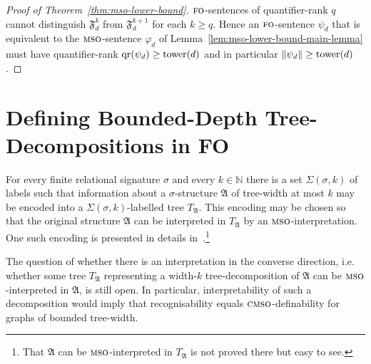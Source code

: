 \documentclass[11pt]{article}
\renewcommand{\phi}{\varphi}
\newcommand{\tower}{\textup{tower}}
\newcommand{\logic}[1]{\textsc{#1}}
\newcommand{\FO}{\logic{fo}}
\newcommand{\MSO}{\logic{mso}}
\newcommand{\CMSO}{\logic{cmso}}
\newcommand{\size}[1]{\|#1\|}
\newcommand{\qr}[1]{\operatorname{qr}(#1)}
\newcommand{\struct}[1]{\mathfrak{#1}}
\newcommand{\AS}{\struct{A}}
\newcommand{\FS}{\struct{F}}
\newcommand{\N}{\mathbb{N}}
\begin{document}
\begin{proof}[Proof of Theorem~\ref{thm:mso-lower-bound}]  
  $\FO$-sentences of quantifier-rank $q$ cannot distinguish $\FS_d^k$
  from $\FS_d^{k+1}$ for each $k\geq q$. Hence an $\FO$-sentence
  $\psi_d$ that is equivalent to the $\MSO$-sentence $\phi_d$ of
  Lemma~\ref{lem:mso-lower-bound-main-lemma} must have quantifier-rank
  $\qr{\psi_d}\geq \tower(d)$ and in particular $\size{\psi_d} \geq
  \tower(d)$.
\end{proof}

\section{Defining Bounded-Depth Tree-Decompositions in FO}
\label{sec:canondecomp}

For every finite relational signature $\sigma$ and every $k \in \N$
there is a set $\Sigma(\sigma,k)$ of labels such that information
about a $\sigma$-structure $\AS$ of tree-width at most $k$ may be
encoded into a $\Sigma(\sigma,k)$-labelled tree $T_\AS$. This encoding
may be chosen so that the original structure $\AS$ can be interpreted in
$T_\AS$ by an $\MSO$-interpretation. One such encoding is presented in
details in~\cite[Section~11.4]{FlumGrohe2004}.\footnote{That $\AS$ can
  be $\MSO$-interpreted in $T_\AS$ is not proved there but easy to see.}

The question of whether there is an interpretation in the converse
direction, i.e. whether some tree $T_\AS$ representing a width-$k$
tree-decomposition of $\AS$ can be $\MSO{}$-interpreted in $\AS$, is still
open. In particular, interpretability of such a decomposition would
imply that recognisability equals $\CMSO$-definability for graphs of
bounded tree-width.
\end{document}
